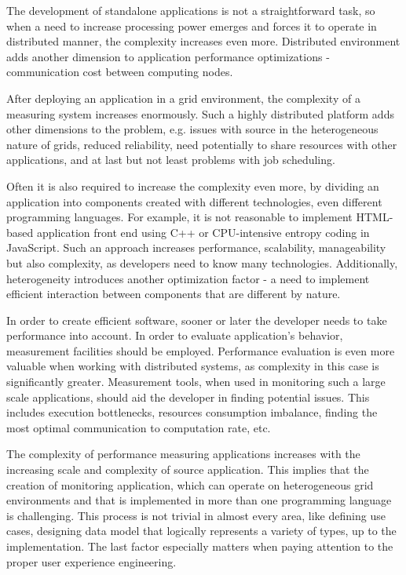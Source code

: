 The development of standalone applications is not a straightforward task, so when a need to increase processing power emerges and forces it to operate in distributed manner, the complexity increases even more. Distributed environment adds another dimension to application performance optimizations - communication cost between computing nodes.

After deploying an application in a grid environment, the complexity of a measuring system increases enormously. Such a highly distributed platform adds other dimensions to the problem, e.g. issues with source in the heterogeneous nature of grids, reduced reliability, need potentially to share resources with other applications, and at last but not least problems with job scheduling.

Often it is also required to increase the complexity even more, by dividing an application into components created with different technologies, even different programming languages. For example, it is not reasonable to implement HTML-based application front end using C++ or CPU-intensive entropy coding in JavaScript. Such an approach increases performance, scalability, manageability but also complexity, as developers need to know many technologies. Additionally, heterogeneity introduces another optimization factor - a need to implement efficient interaction between components that are different by nature.

In order to create efficient software, sooner or later the developer needs to take performance into account. In order to evaluate application\rq{}s behavior, measurement facilities should be employed. Performance evaluation is even more valuable when working with distributed systems, as complexity in this case is significantly greater. Measurement tools, when used in monitoring such a large scale applications, should aid the developer in finding potential issues. This includes execution bottlenecks, resources consumption imbalance, finding the most optimal communication to computation rate, etc.

The complexity of performance measuring applications increases with the increasing scale and complexity of source application. This implies that the creation of monitoring application, which can operate on heterogeneous grid environments and that is implemented in more than one programming language is challenging. This process is not trivial in almost every area, like defining use cases, designing data model that logically represents a variety of types, up to the implementation. The last factor especially matters when paying attention to the proper user experience engineering.

